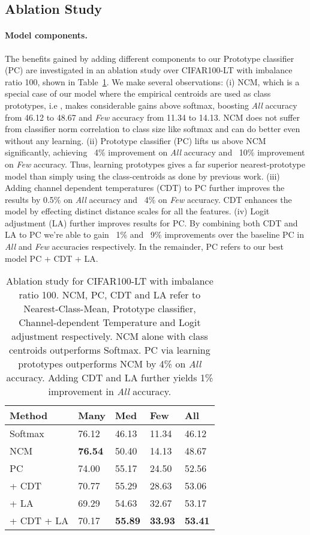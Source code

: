 \documentclass{article}
\begin{document}
\subsection{Ablation Study}
\label{ablations}
\paragraph{Model components.} The benefits gained by adding different components to our Prototype classifier (PC) are investigated in an ablation study over CIFAR100-LT with imbalance ratio 100, shown in Table~\ref{tab:table 1}. We make several observations: (i) NCM, which is a special case of our model where the empirical centroids are used as class prototypes, i.e , makes considerable gains above softmax, boosting \textit{All} accuracy from 46.12 to 48.67 and \textit{Few} accuracy from 11.34 to 14.13. NCM does not suffer from classifier norm correlation to class size like softmax and can do better even without any learning. (ii) Prototype classifier (PC) lifts us above NCM significantly, achieving ~4\% improvement on \textit{All} accuracy and ~10\% improvement on \textit{Few} accuracy. Thus, learning prototypes gives a far superior nearest-prototype model than simply using the class-centroids as done by previous work. (iii) Adding channel dependent temperatures (CDT) to PC further improves the results by 0.5\% on \textit{All} accuracy and ~4\% on \textit{Few} accuracy. CDT enhances the model by effecting distinct distance scales for all the features. (iv) Logit adjustment (LA) further improves results for PC. By combining both CDT and LA to PC we're able to gain ~1\% and ~9\% improvements  over the baseline PC in \textit{All} and \textit{Few} accuracies respectively. In the remainder, PC refers to our best model PC + CDT + LA. 

\begin{table}[t!]
    \centering
\begin{tabular}{l | l l l l }
    \toprule
    Method & Many & Med & Few & All \\
    \midrule
    Softmax & 76.12 & 46.13 & 11.34 & 46.12  \\
    \midrule
    NCM & \textbf{76.54} & 50.40 & 14.13 & 48.67 \\
    PC & 74.00 & 55.17 & 24.50 & 52.56 \\
     + CDT  & 70.77 & 55.29 & 28.63 & 53.06 \\
     + LA  & 69.29 & 54.63 & 32.67 & 53.17 \\
     + CDT + LA  & 70.17 & \textbf{55.89} & \textbf{33.93} & \textbf{53.41} \\
    \bottomrule
    \end{tabular}
    \caption{Ablation study for CIFAR100-LT with imbalance ratio 100. NCM, PC, CDT and LA refer to Nearest-Class-Mean, Prototype classifier, Channel-dependent Temperature and Logit adjustment respectively. NCM alone with class centroids outperforms Softmax. PC via learning prototypes outperforms NCM by 4\% on \textit{All} accuracy. Adding CDT and LA further yields 1\% improvement in \textit{All} accuracy.}
    \label{tab:table 1}
\end{table}
\end{document}
